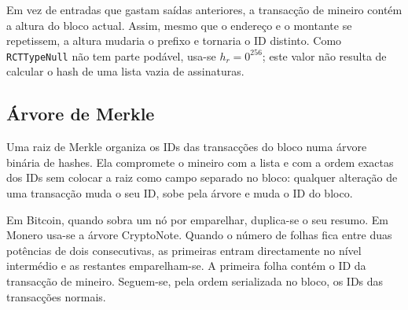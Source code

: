 Em vez de entradas que gastam saídas anteriores, a transacção de mineiro
contém a altura do bloco actual.
Assim, mesmo que o endereço e o montante se repetissem, a altura mudaria o
prefixo e tornaria o ID distinto. Como {\tt RCTTypeNull} não tem parte
podável, usa-se $h_r=0^{256}$; este valor não resulta de calcular o hash de uma
lista vazia de assinaturas.


\subsection{Árvore de Merkle}
\label{subsec:merkle-tree}

Uma raiz de Merkle \cite{merkle-tree} organiza os IDs das transacções do bloco
numa árvore binária de hashes. Ela compromete o mineiro com a lista e com a
ordem exactas dos IDs sem colocar a raiz como campo separado no bloco: qualquer
alteração de uma transacção muda o seu ID, sobe pela árvore e muda o ID do
bloco.%
   

Em Bitcoin, quando sobra um nó por emparelhar, duplica-se o seu resumo.
Em Monero usa-se a árvore CryptoNote. Quando o número de folhas fica entre
duas potências de dois consecutivas, as primeiras entram directamente no
nível intermédio e as restantes emparelham-se. A primeira folha contém o
ID da transacção de mineiro. Seguem-se, pela ordem
serializada no bloco, os IDs das transacções normais.



